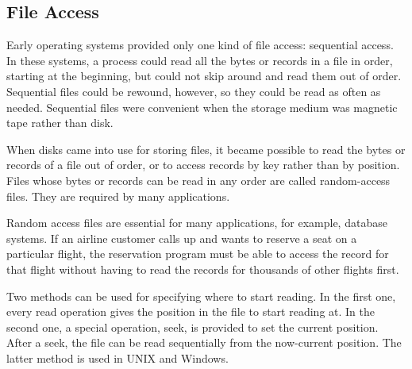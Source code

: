 \subsection{File Access}
Early operating systems provided only one kind of file access: sequential access. In these systems, a process could read all the bytes or records in a file in order, starting at the beginning, but could not skip around and read them out of order. Sequential files could be rewound, however, so they could be read as often as needed. Sequential files were convenient when the storage medium was magnetic tape rather than disk.

When disks came into use for storing files, it became possible to read the bytes or records of a file out of order, or to access records by key rather than by position. Files whose bytes or records can be read in any order are called random-access files. They are required by many applications.

Random access files are essential for many applications, for example, database systems. If an airline customer calls up and wants to reserve a seat on a particular flight, the reservation program must be able to access the record for that flight without having to read the records for thousands of other flights first.

Two methods can be used for specifying where to start reading. In the first one, every read operation gives the position in the file to start reading at. In the second one, a special operation, seek, is provided to set the current position. After a seek, the file can be read sequentially from the now-current position. The latter method is used in UNIX and Windows.


